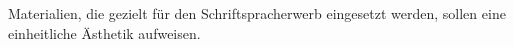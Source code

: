 Materialien, die gezielt für den Schriftspracherwerb eingesetzt werden, sollen eine einheitliche Ästhetik aufweisen.